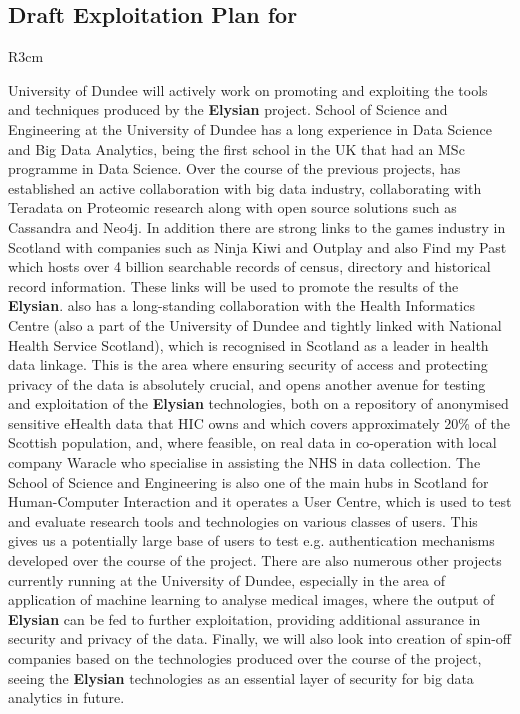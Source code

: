 \documentclass[a4paper,11pt]{article}
\newcommand{\project}[1]{\textbf{#1}\xspace}
\newcommand{\SECURITY}{\project{Elysian}}
\newcommand{\TheProject}{\SECURITY}
\begin{document}
\horizontalline

\subsection*{Draft Exploitation Plan for \UODshort{}}

\begin{wrapfigure}{R}{3cm}
\vspace{-1.4cm}
\hfill {}
\vspace{-0.9cm}
\end{wrapfigure}

University of Dundee will actively work on promoting and exploiting the tools and techniques produced by the \TheProject{} project. School of Science and Engineering at the University of Dundee has a long experience in Data Science and Big Data Analytics, being the first school in the UK that had an MSc programme in Data Science. Over the course of the previous projects, \UOD has established an active collaboration with big data industry, collaborating with Teradata  on Proteomic research along with open source solutions such as Cassandra and Neo4j. In addition there are strong links to the games industry in Scotland with companies such as Ninja Kiwi and Outplay and also Find my Past which hosts over 4 billion searchable records of census, directory and historical record information. These links will be used to promote the results of the \TheProject{}. \UOD also has a long-standing collaboration with the Health Informatics Centre (also a part of the University of Dundee and tightly linked with National Health Service Scotland), which is recognised in Scotland as a leader in health data linkage. This is the area where ensuring security of access and protecting privacy of the data is absolutely crucial, and opens another avenue for testing and exploitation of the \TheProject{} technologies, both on a repository of anonymised sensitive eHealth data that HIC owns and which covers approximately 20\% of the Scottish population, and, where feasible, on real data in co-operation with local company Waracle who specialise in assisting the NHS in data collection. The School of Science and Engineering is also one of the main hubs in Scotland for Human-Computer Interaction and it operates a User Centre, which is used to test and evaluate research tools and technologies on various classes of users. This gives us a potentially large base of users to test e.g. authentication mechanisms developed over the course of the project. There are also numerous other projects currently running at the University of Dundee, especially in the area of application of machine learning to analyse medical images, where the output of \TheProject{} can be fed to further exploitation, providing additional assurance in security and privacy of the data. Finally, we will also look into creation of spin-off companies based on the technologies produced over the course of the project, seeing the \TheProject{} technologies as an essential layer of security for big data analytics in future.
\end{document}

